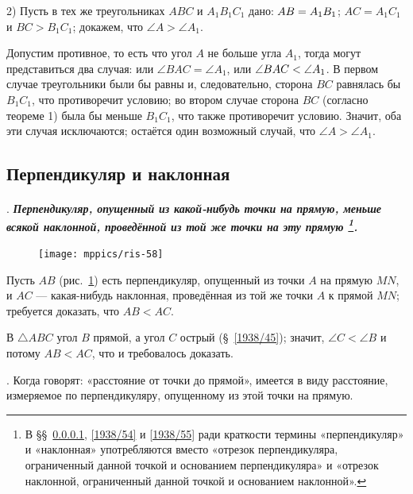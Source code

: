 \documentclass[twoside]{book}
\begin{document}
2) Пусть в тех же треугольниках $ABC$ и $A_1B_1C_1$ дано:
$AB\z=A_1B_1$;
$AC=A_1C_1$ и $BC>B_1C_1$;
докажем, что $\angle A > \angle A_1$.

Допустим противное, то есть что угол $A$ не больше угла $A_1$, тогда могут представиться два случая:
или $\angle BAC = \angle A_1$, или $\angle BAC \z< \angle A_1$.
В первом случае треугольники были бы равны и, следовательно, сторона $BC$ равнялась бы $B_1C_1$, что противоречит условию;
во втором случае сторона $BC$ (согласно теореме 1) была бы меньше $B_1C_1$, что также противоречит условию.
Значит, оба эти случая исключаются;
остаётся один возможный случай, что $\angle A > \angle A_1$.


\subsection*{Перпендикуляр и наклонная}

{\sloppy

\paragraph{}\label{1938/53}
.
\textbf{\emph{Перпендикуляр, опущенный из какой-нибудь точки на прямую, меньше всякой наклонной, проведённой из той же точки на эту прямую%
\footnote{В §§~\ref{1938/53}, \ref{1938/54} и \ref{1938/55} ради краткости термины «перпендикуляр» и «наклонная» употребляются вместо «отрезок перпендикуляра, ограниченный данной точкой и основанием перпендикуляра» и «отрезок наклонной, ограниченный данной точкой и основанием наклонной».}.%
}}

}

\begin{figure}
\centering
\texttt{[image: mppics/ris-58]}
\caption{}\label{1938/ris-58}
\end{figure}

Пусть $AB$ (рис.~\ref{1938/ris-58}) есть перпендикуляр, опущенный из точки $A$ на прямую $MN$, и $AC$ — какая-нибудь наклонная, проведённая из той же точки $A$ к прямой $MN$;
требуется доказать, что $AB<AC$.

В $\triangle ABC$ угол $B$ прямой, а угол $C$ острый (§~\ref{1938/45});
значит, $\angle C<\angle B$ и потому $AB<AC$, что и требовалось доказать.

\smallskip
\mbox{.}
Когда говорят:
«расстояние от точки до прямой», имеется в виду  расстояние, измеряемое по перпендикуляру, опущенному из этой точки на прямую.
\end{document}
